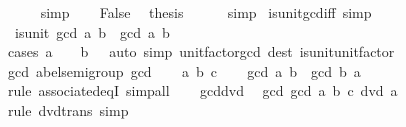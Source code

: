 \begin{isabellebody}
\ \ \ \ \isamarkupfalse%
\ simp\isanewline
\ \ \isamarkupfalse%
\ False\ \isamarkupfalse%
\ {\isacharquery}{\kern0pt}thesis\isanewline
\ \ \ \ \isamarkupfalse%
\ simp\isanewline
{}\isamarkupfalse%
%
\endisatagproof
{\isafoldproof}%
%
\isadelimproof
\isanewline
%
\endisadelimproof
\isanewline
{}\isamarkupfalse%
\ is{\isacharunderscore}{\kern0pt}unit{\isacharunderscore}{\kern0pt}gcd{\isacharunderscore}{\kern0pt}iff\ {\isacharbrackleft}{\kern0pt}simp{\isacharbrackright}{\kern0pt}{\isacharcolon}{\kern0pt}\isanewline
\ \ {\isachardoublequoteopen}is{\isacharunderscore}{\kern0pt}unit\ {\isacharparenleft}{\kern0pt}gcd\ a\ b{\isacharparenright}{\kern0pt}\ {\isasymlongleftrightarrow}\ gcd\ a\ b\ {\isacharequal}{\kern0pt}\ {}{\isachardoublequoteclose}\isanewline
%
\isadelimproof
\ \ %
\endisadelimproof
%
\isatagproof
{}\isamarkupfalse%
\ {\isacharparenleft}{\kern0pt}cases\ {\isachardoublequoteopen}a\ {\isacharequal}{\kern0pt}\ {}\ {\isasymand}\ b\ {\isacharequal}{\kern0pt}\ {}{\isachardoublequoteclose}{\isacharparenright}{\kern0pt}\ {\isacharparenleft}{\kern0pt}auto\ simp{\isacharcolon}{\kern0pt}\ unit{\isacharunderscore}{\kern0pt}factor{\isacharunderscore}{\kern0pt}gcd\ dest{\isacharcolon}{\kern0pt}\ is{\isacharunderscore}{\kern0pt}unit{\isacharunderscore}{\kern0pt}unit{\isacharunderscore}{\kern0pt}factor{\isacharparenright}{\kern0pt}%
\endisatagproof
{\isafoldproof}%
%
\isadelimproof
\isanewline
%
\endisadelimproof
\isanewline
{}\isamarkupfalse%
\ gcd{\isacharcolon}{\kern0pt}\ abel{\isacharunderscore}{\kern0pt}semigroup\ gcd\isanewline
%
\isadelimproof
%
\endisadelimproof
%
\isatagproof
{}\isamarkupfalse%
\isanewline
\ \ \isamarkupfalse%
\ a\ b\ c\isanewline
\ \ \isamarkupfalse%
\ {\isachardoublequoteopen}gcd\ a\ b\ {\isacharequal}{\kern0pt}\ gcd\ b\ a{\isachardoublequoteclose}\isanewline
\ \ \ \ \isamarkupfalse%
\ {\isacharparenleft}{\kern0pt}rule\ associated{\isacharunderscore}{\kern0pt}eqI{\isacharparenright}{\kern0pt}\ simp{\isacharunderscore}{\kern0pt}all\isanewline
\ \ \isamarkupfalse%
\ gcd{\isacharunderscore}{\kern0pt}dvd{}\ \isamarkupfalse%
\ {\isachardoublequoteopen}gcd\ {\isacharparenleft}{\kern0pt}gcd\ a\ b{\isacharparenright}{\kern0pt}\ c\ dvd\ a{\isachardoublequoteclose}\isanewline
\ \ \ \ \isamarkupfalse%
\ {\isacharparenleft}{\kern0pt}rule\ dvd{\isacharunderscore}{\kern0pt}trans{\isacharparenright}{\kern0pt}\ simp\isanewline

\end{isabellebody}

